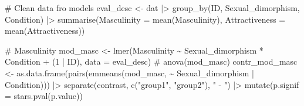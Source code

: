 \documentclass[
  bookmarksnumbered]{article}
\newenvironment{Shaded}{\begin{snugshade}}{\end{snugshade}}
\newcommand{\AttributeTok}[1]{\textcolor[rgb]{0.80,0.80,0.80}{#1}}
\newcommand{\CommentTok}[1]{\textcolor[rgb]{0.50,0.62,0.50}{#1}}
\newcommand{\DecValTok}[1]{\textcolor[rgb]{0.86,0.86,0.80}{#1}}
\newcommand{\FunctionTok}[1]{\textcolor[rgb]{0.94,0.94,0.56}{#1}}
\newcommand{\NormalTok}[1]{\textcolor[rgb]{0.80,0.80,0.80}{#1}}
\newcommand{\OtherTok}[1]{\textcolor[rgb]{0.94,0.94,0.56}{#1}}
\newcommand{\SpecialCharTok}[1]{\textcolor[rgb]{0.86,0.64,0.64}{#1}}
\newcommand{\StringTok}[1]{\textcolor[rgb]{0.80,0.58,0.58}{#1}}
\begin{document}
\begin{Shaded}
\begin{Highlighting}[]
\CommentTok{\# Clean data fro models}
\NormalTok{eval\_desc }\OtherTok{\textless{}{-}}\NormalTok{ dat }\SpecialCharTok{|\textgreater{}}
  \FunctionTok{group\_by}\NormalTok{(ID, Sexual\_dimorphism, Condition) }\SpecialCharTok{|\textgreater{}} 
  \FunctionTok{summarise}\NormalTok{(}\AttributeTok{Masculinity =} \FunctionTok{mean}\NormalTok{(Masculinity),}
            \AttributeTok{Attractiveness =} \FunctionTok{mean}\NormalTok{(Attractiveness))}

\CommentTok{\# Masculinity}
\NormalTok{mod\_masc }\OtherTok{\textless{}{-}} \FunctionTok{lmer}\NormalTok{(Masculinity }\SpecialCharTok{\textasciitilde{}}\NormalTok{ Sexual\_dimorphism }\SpecialCharTok{*}\NormalTok{ Condition }\SpecialCharTok{+}\NormalTok{ (}\DecValTok{1} \SpecialCharTok{|}\NormalTok{ ID), }\AttributeTok{data =}\NormalTok{ eval\_desc)}
\CommentTok{\# anova(mod\_masc)}
\NormalTok{contr\_mod\_masc }\OtherTok{\textless{}{-}} \FunctionTok{as.data.frame}\NormalTok{(}\FunctionTok{pairs}\NormalTok{(}\FunctionTok{emmeans}\NormalTok{(mod\_masc,}
                                              \SpecialCharTok{\textasciitilde{}}\NormalTok{ Sexual\_dimorphism }\SpecialCharTok{|}\NormalTok{ Condition))) }\SpecialCharTok{|\textgreater{}} 
  \FunctionTok{separate}\NormalTok{(contrast, }\FunctionTok{c}\NormalTok{(}\StringTok{"group1"}\NormalTok{, }\StringTok{"group2"}\NormalTok{), }\StringTok{" {-} "}\NormalTok{) }\SpecialCharTok{|\textgreater{}} 
  \FunctionTok{mutate}\NormalTok{(}\AttributeTok{p.signif =} \FunctionTok{stars.pval}\NormalTok{(p.value))}


\end{Highlighting}
\end{Shaded}
\end{document}
